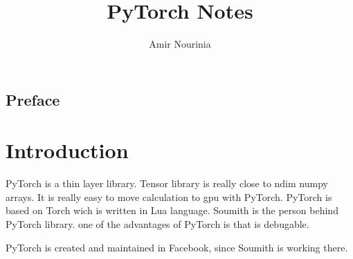 \documentclass[11pt,twoside,a4paper]{report}
\title{PyTorch Notes}
\author{Amir Nourinia}
\begin{document}
\maketitle
\tableofcontents
\section{Preface}
\chapter{Introduction}

PyTorch is a thin layer library. Tensor library is really close to ndim numpy arrays. It is really easy to move calculation to gpu with PyTorch.
PyTorch is based on Torch wich is written in Lua language. Soumith is the person behind PyTorch library. one of the advantages of PyTorch is that is debugable.

PyTorch is created and maintained in Facebook, since Soumith is working there.
\end{document}
